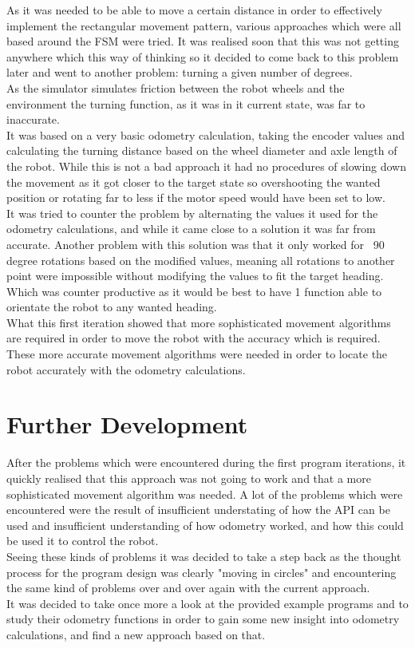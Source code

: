 As it was needed to be able to move a certain distance in order to effectively implement the rectangular movement pattern, various approaches which were all based around the FSM were tried.
It was realised soon that this was not getting anywhere which this way of thinking so it decided to come back to this problem later and went to another problem: turning a given number of degrees. \\
As the simulator simulates friction between the robot wheels and the environment the turning function, as it was in it current state, was far to inaccurate. \\
It was based on a very basic odometry calculation, taking the encoder values and calculating the turning distance based on the wheel diameter and axle length of the robot. While this is not a bad approach it had no procedures of slowing down the movement as it got closer to the target state so overshooting the wanted position or rotating far to less if the motor speed would have been set to low. \\
It was tried to counter the problem by alternating the values it used for the odometry calculations, and while it came close to a solution it was far from accurate. Another problem with this solution was that it only worked for ~90 degree rotations based on the modified values, meaning all rotations to another point were impossible without modifying the values to fit the target heading. Which was counter productive as it would be best to have 1 function able to orientate the robot to any wanted heading. \\[3ex]

What this first iteration showed that more sophisticated movement algorithms are required in order to move the robot with the accuracy which is required. These more accurate movement algorithms were needed in order to locate the robot accurately with the odometry calculations. 

\section{Further Development}
After the problems which were encountered during the first program iterations, it quickly realised that this approach was not going to work and that a more sophisticated movement algorithm was needed. A lot of the problems which were encountered were the result of insufficient understating of how the API can be used and insufficient understanding of how odometry worked, and how this could be used it to control the robot.\\
Seeing these kinds of problems it was decided to take a step back as the thought process for the program design was clearly "moving in circles" and encountering the same kind of problems over and over again with the current approach. \\
It was decided to take once more a look at the provided example programs and to study their odometry functions in order to gain some new insight into odometry calculations, and find a new approach based on that.

